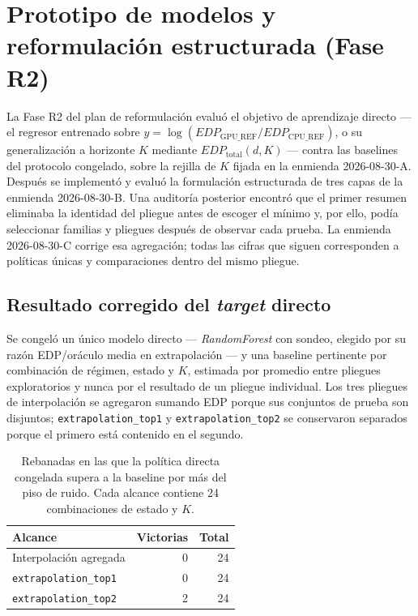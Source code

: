 \documentclass[12pt,oneside,spanish]{book}
\begin{document}
\section{Prototipo de modelos y reformulación estructurada (Fase R2)}
\label{sec:resultados-r2-intro}

La Fase R2 del plan de reformulación evaluó el objetivo de aprendizaje directo --- el regresor entrenado sobre $y = \log(EDP_{\text{GPU\_REF}} / EDP_{\text{CPU\_REF}})$, o su generalización a horizonte $K$ mediante $EDP_{\text{total}}(d,K)$ --- contra las baselines del protocolo congelado, sobre la rejilla de $K$ fijada en la enmienda 2026-08-30-A. Después se implementó y evaluó la formulación estructurada de tres capas de la enmienda 2026-08-30-B. Una auditoría posterior encontró que el primer resumen eliminaba la identidad del pliegue antes de escoger el mínimo y, por ello, podía seleccionar familias y pliegues después de observar cada prueba. La enmienda 2026-08-30-C corrige esa agregación; todas las cifras que siguen corresponden a políticas únicas y comparaciones dentro del mismo pliegue.

\subsection{Resultado corregido del \textit{target} directo}
\label{sec:resultados-r2-directo}

Se congeló un único modelo directo --- \textit{RandomForest} con sondeo, elegido por su razón EDP/oráculo media en extrapolación --- y una baseline pertinente por combinación de régimen, estado y $K$, estimada por promedio entre pliegues exploratorios y nunca por el resultado de un pliegue individual. Los tres pliegues de interpolación se agregaron sumando EDP porque sus conjuntos de prueba son disjuntos; \texttt{extrapolation\_top1} y \texttt{extrapolation\_top2} se conservaron separados porque el primero está contenido en el segundo.

\begin{table}[H]
\centering
\caption[Resultado corregido del modelo directo en R2]{Rebanadas en las que la política directa congelada supera a la baseline por más del piso de ruido. Cada alcance contiene 24 combinaciones de estado y $K$.}
\label{tab:r2-directo-corregido}
\begin{tabular}{lrr}
\toprule
\textbf{Alcance} & \textbf{Victorias} & \textbf{Total} \\
\midrule
Interpolación agregada       & 0 & 24 \\
\texttt{extrapolation\_top1} & 0 & 24 \\
\texttt{extrapolation\_top2} & 2 & 24 \\
\bottomrule
\end{tabular}
\end{table}
\end{document}
